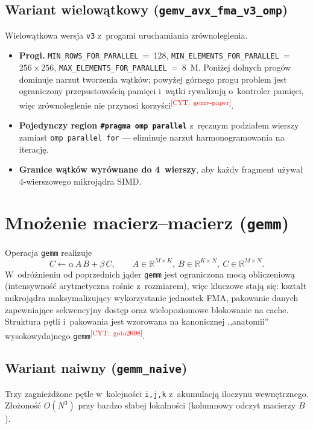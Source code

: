 \documentclass[a4paper,12pt]{book} %
\newcommand{\todocite}[1]{\textsuperscript{\textcolor{red}{[CYT:~#1]}}}
\newcommand{\kod}[1]{\texttt{#1}}
\begin{document}
\subsection{Wariant wielowątkowy (\kod{gemv\_avx\_fma\_v3\_omp})}
Wielowątkowa wersja \kod{v3} z~progami uruchamiania zrównoleglenia.
\begin{itemize}
\item \textbf{Progi.} \kod{MIN\_ROWS\_FOR\_PARALLEL}~=~128,
  \kod{MIN\_ELEMENTS\_FOR\_PARALLEL}~=~$256\times256$,
  \kod{MAX\_ELEMENTS\_FOR\_PARALLEL}~=~8~M. Poniżej dolnych progów dominuje
  narzut tworzenia wątków; powyżej górnego progu problem jest ograniczony
  przepustowością pamięci i~wątki rywalizują o~kontroler pamięci, więc
  zrównoleglenie nie przynosi korzyści\todocite{gemv-paper}.
\item \textbf{Pojedynczy region \kod{\#pragma omp parallel}} z~ręcznym podziałem
  wierszy zamiast \kod{omp parallel for} --- eliminuje narzut harmonogramowania
  na iterację.
\item \textbf{Granice wątków wyrównane do 4~wierszy}, aby każdy fragment używał
  4-wierszowego mikrojądra SIMD.
\end{itemize}

\section{Mnożenie macierz--macierz (\kod{gemm})}
\label{sec:gemm}

Operacja \kod{gemm} realizuje
\begin{equation}
C \leftarrow \alpha\,A\,B + \beta\,C,\qquad
A\in\mathbb{R}^{M\times K},\ B\in\mathbb{R}^{K\times N},\ C\in\mathbb{R}^{M\times N}.
\label{eq:gemm}
\end{equation}
W~odróżnieniu od poprzednich jąder \kod{gemm} jest ograniczona mocą obliczeniową
(intensywność arytmetyczna rośnie z~rozmiarem), więc kluczowe stają się: kształt
mikrojądra maksymalizujący wykorzystanie jednostek FMA, pakowanie danych
zapewniające sekwencyjny dostęp oraz wielopoziomowe blokowanie na cache. Struktura
pętli i~pakowania jest wzorowana na kanonicznej ,,anatomii'' wysokowydajnego
\kod{gemm}\todocite{goto2008}.

\subsection{Wariant naiwny (\kod{gemm\_naive})}
Trzy zagnieżdżone pętle w~kolejności \kod{i,j,k} z~akumulacją iloczynu
wewnętrznego. Złożoność $O(N^3)$ przy bardzo słabej lokalności (kolumnowy odczyt
macierzy $B$).
\end{document}

